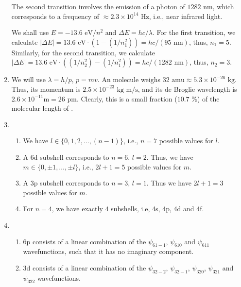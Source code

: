 \documentclass[10pt]{article}
\begin{document}
\begin{enumerate}
                The second transition involves the emission of a photon of $1282 \text{ nm}$, which corresponds to
                a frequency of $\approx 2.3 \times 10^{14} \text{ Hz}$, i.e., near infrared light.

                We shall use $E = -13.6 \text{ eV}/n^2$ and $\Delta E = hc/\lambda$. For the first transition, we calculate
                $|\Delta{E}| = 13.6 \text{ eV} \cdot (1 - (1 /n_1^2)) = hc/(95 \text{ nm})$, thus, $n_1 = 5$.
                Similarly, for the second transition, we calculate $|\Delta{E}| = 13.6 \text{ eV} \cdot ((1 /n_2^2) - (1 /n_1^2)) = hc/(1282 \text{ nm})$,
                thus, $n_2 = 3$.
                
                \item We will use $\lambda = h/p$, $p = mv$.
                An  molecule weighs $32 \text{ amu} \approx 5.3 \times 10^{-26} \text{ kg}$. Thus, its momentum is $2.5 \times 10^{-23}
                \text{ kg m/s}$, and its de Broglie wavelength is $2.6 \times 10^{-11} \text{m} = 26 \text{ pm}$. Clearly, this is
                a small fraction ($10.7 \text{ \%}$) of the molecular length of .

                \item 
                \begin{enumerate}
                        \item We have $l \in \{0, 1, 2, \dots, (n-1)\}$, i.e., $n = 7$ possible values for $l$.
                        \item A 6d subshell corresponds to $n = 6$, $l = 2$. Thus, we have $m \in \{0, \pm 1, \dots, \pm l\}$,
                        i.e., $2l + 1 = 5$ possible values for $m$.
                        \item A 3p subshell corresponds to $n = 3$, $l = 1$. Thus we have $2l + 1 = 3$ possible values for $m$.
                        \item For $n = 4$, we have exactly $4$ subshells, i.e, 4s, 4p, 4d and 4f.
                \end{enumerate}

                \item
                \begin{enumerate}
                        \item 6p consists of a linear combination of the $\psi_{61-1}$, $\psi_{610}$ and $\psi_{611}$ wavefunctions, such
                        that it has no imaginary component.
                        \item 3d consists of a linear combination of the $\psi_{32-2}$, $\psi_{32-1}$, $\psi_{320}$, $\psi_{321}$ and $\psi_{322}$
                        wavefunctions.
                \end{enumerate}
        \end{enumerate}
\end{document}
